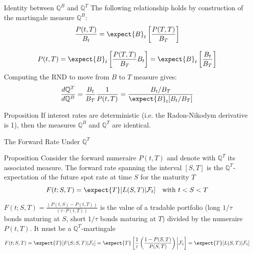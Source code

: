\documentclass{beamer}
\begin{document}
\begin{frame}{Identity between $\mathbb{Q}^B$ and $\mathbb{Q}^T$}
	The following relationship holds by construction of the martingale measure $\mathbb{Q}^B$:
	\begin{equation*}
		\begin{gathered}
			\frac{P(t,T)}{B_t}=\expect{B}_t\left[\frac{P(T,T)}{B_T}\right]\\[0.3cm]
			P(t,T)=\expect{B}_t\left[\frac{P(T,T)}{B_T}B_t\right] = \expect{B}_t\left[\frac{B_t}{B_T}\right]
		\end{gathered}
	\end{equation*}
	\pause
	Computing the RND to move from $B$ to $T$ measure gives:
	\begin{equation*}
		\frac{d\mathbb{Q}^T}{d\mathbb{Q}^B} = \frac{B_t}{B_T}\frac{1}{P(t,T)} =\frac{B_t/B_T}{\expect{B}_t[B_t/B_T]}
	\end{equation*}
	\myendproof
	\pause
	\begin{block}{Proposition}
		If interest rates are deterministic (i.e. the Radon-Nikodym derivative is 1), then the measures $\mathbb{Q}^B$ and $\mathbb{Q}^T$ are identical.
	\end{block}
\end{frame}

\begin{frame}{The Forward Rate Under $\mathbb{Q}^T$}
	\begin{block}{Proposition}
		Consider the forward numeraire $P(t,T)$ and denote with $\mathbb{Q}^T$ its associated measure.
		The forward rate spanning the interval $[S,T]$ is the $\mathbb{Q}^T$-expectation of the future spot rate at time $S$ for the maturity $T$
		\begin{equation}
			F(t;S,T) =\expect{T}[L(S,T)|\mathcal{F}_t]\quad \text{with }t<S<T
		\end{equation}
	\end{block}
	\vfill
	$F(t;S,T) = \frac{(P(t,S)-P(t,T))}{(\tau\cdot P(t,T))}$ is the value of a tradable portfolio (long $1/\tau$ bonds maturing at $S$, short $1/\tau$ bonds maturing at $T$) divided by the numeraire $P(t,T)$. It must be a $\mathbb{Q}^T$-martingale
	\begin{equation*}
		F(t;S,T) = \expect{T}[F(S;S,T)|\mathcal{F}_t] = \expect{T}\left[\frac{1}{\tau}\left(\frac{1-P(S,T)}{P(S,T)}\right)\bigg|\mathcal{F}_t\right] = \expect{T}[L(S,T)|\mathcal{F}_t]
	\end{equation*}
	\myendproof
\end{frame}
\end{document}
